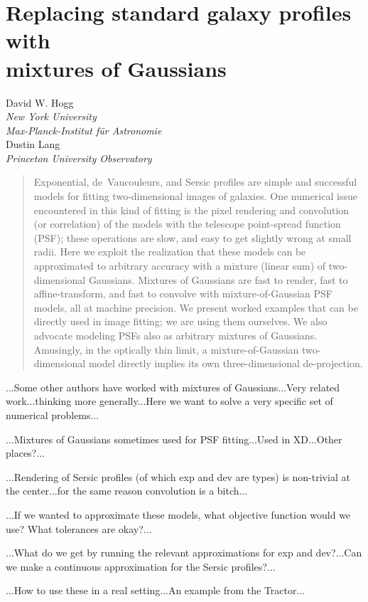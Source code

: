 \documentclass[12pt]{article}
\begin{document}
\section*{Replacing standard galaxy profiles with \\ mixtures of Gaussians}

\noindent
David W. Hogg \\
\textsl{New York University} \\
\textsl{Max-Planck-Institut f\"ur Astronomie} \\[1ex]
Dustin Lang \\
\textsl{Princeton University Observatory}

\begin{abstract}
Exponential, de~Vaucouleurs, and Sersic profiles are simple and
successful models for fitting two-dimensional images of galaxies.  One
numerical issue encountered in this kind of fitting is the pixel
rendering and convolution (or correlation) of the models with the
telescope point-spread function (PSF); these operations are slow, and
easy to get slightly wrong at small radii.  Here we exploit the
realization that these models can be approximated to arbitrary
accuracy with a mixture (linear sum) of two-dimensional Gaussians.
Mixtures of Gaussians are fast to render, fast to affine-transform,
and fast to convolve with mixture-of-Gaussian PSF models, all at
machine precision.  We present worked examples that can be directly
used in image fitting; we are using them ourselves.  We also advocate
modeling PSFs also as arbitrary mixtures of Gaussians.  Amusingly, in
the optically thin limit, a mixture-of-Gaussian two-dimensional model
directly implies its own three-dimensional de-projection.
\end{abstract}

...Some other authors have worked with mixtures of Gaussians...Very
related work...thinking more generally...Here we want to solve a very
specific set of numerical problems...

...Mixtures of Gaussians sometimes used for PSF fitting...Used in
XD...Other places?...

...Rendering of Sersic profiles (of which exp and dev are types) is
non-trivial at the center...for the same reason convolution is a
bitch...

...If we wanted to approximate these models, what objective function
would we use?  What tolerances are okay?...

...What do we get by running the relevant approximations for exp and
dev?...Can we make a continuous approximation for the Sersic
profiles?...

...How to use these in a real setting...An example from the Tractor...
\end{document}
